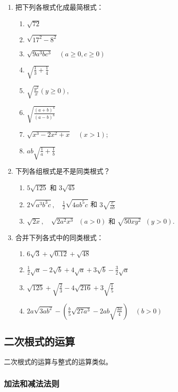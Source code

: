 \begin{ex}
\begin{enumerate}
    \item 把下列各根式化成最简根式：
\begin{enumerate}
    \item $\sqrt{72}$
    \item $\sqrt{17^{2}-8^{2}}$
    \item $\sqrt{9 a^{3} b c^{3}}\quad (a \ge 0, c \ge 0)$
    \item  $\sqrt{\frac{1}{3}+\frac{1}{4}}$
    \item  $\sqrt{\frac{y^{2}}{x}}(y \ge 0)$,
    \item  $\sqrt{\frac{(a+b)^{4}}{(a-b)^{8}}}$
    \item  $\sqrt{x^{3}-2 x^{2}+x}\quad (x>1)$;
    \item $a b \sqrt{\frac{1}{a}+\frac{1}{b}}$
\end{enumerate}
    \item 下列各组根式是不是同类根式？
    \begin{enumerate}
\item $5 \sqrt{125}$ 和 $3 \sqrt{45}$
\item $2 \sqrt{a^{3} b^{3} c},\quad \frac{1}{2} \sqrt{4 a b^{5} c}$ 和 $3 \sqrt{\frac{c}{a b}}$
\item $\sqrt{2 x},\quad \sqrt{2 a^{2} x^{3}}\;\; (a>0)$ 和 $\sqrt{50 x y^{2}}\;\;(y>0)$.
    \end{enumerate}
    \item 合并下列各式中的同类根式：
\begin{enumerate}
    \item $6 \sqrt{3}+\sqrt{0.12}+\sqrt{48}$
    \item $\frac{1}{2} \sqrt{a}- 2 \sqrt{b}+4 \sqrt{a}+3 \sqrt{b}-\frac{3}{2} \sqrt{a}$
    \item $\sqrt{125}+\sqrt{\frac{2}{3}}-4 \sqrt{216}+3 \sqrt{\frac{1}{5}}$
    \item $2 a \sqrt{3 a b^{2}}-\left(\frac{b}{5} \sqrt{27 a^{3}}-2 a b \sqrt{\frac{3a}{4}}\right)\quad (b>0)$
\end{enumerate}
\end{enumerate}
\end{ex}

\subsection{二次根式的运算}
二次根式的运算与整式的运算类似。

\subsubsection{加法和减法法则}

